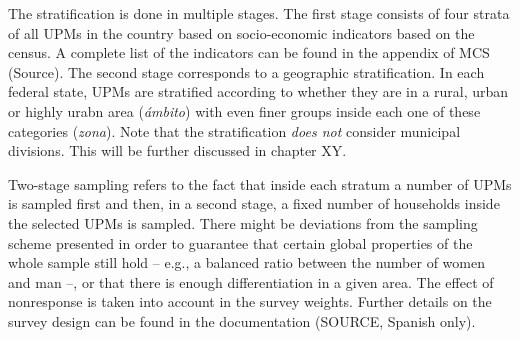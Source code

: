 The stratification is done in multiple stages.
The first stage consists of four strata of all UPMs in the country based on socio-economic indicators based on the census.
A complete list of the indicators can be found in the appendix of MCS (Source).
The second stage corresponds to a geographic stratification.
In each federal state, UPMs are stratified according to whether they are in a rural, urban or highly urabn area (\textit{ámbito}) with even finer groups inside each one of these categories (\textit{zona}).
Note that the stratification \textit{does not} consider municipal divisions. This will be further discussed in chapter XY.

Two-stage sampling refers to the fact that inside each stratum a number of UPMs is sampled first and then, in a second stage, a fixed number of households inside the selected UPMs is sampled.
There might be deviations from the sampling scheme presented in order to guarantee that certain global properties of the whole sample still hold – e.g., a balanced ratio between the number of women and man –, or that there is enough differentiation in a given area.
The effect of nonresponse is taken into account in the survey weights. Further details on the survey design can be found in the documentation (SOURCE, Spanish only).



\vspace{-0.4 cm}